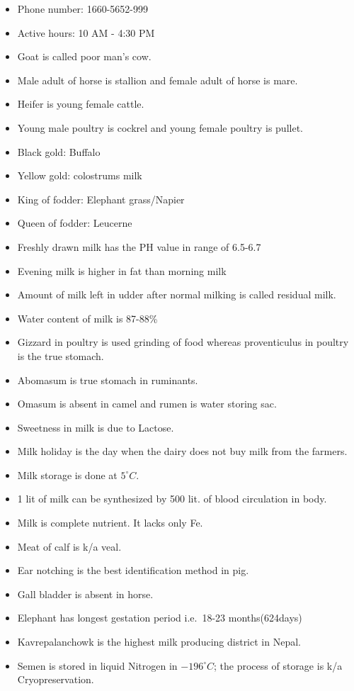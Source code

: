 \documentclass[
  openany]{book}
\begin{document}
\begin{itemize}
\item
  Phone number: 1660-5652-999
\item
  Active hours: 10 AM - 4:30 PM
\item
  Goat is called poor man's cow.
\item
  Male adult of horse is stallion and female adult of horse is mare.
\item
  Heifer is young female cattle.
\item
  Young male poultry is cockrel and young female poultry is pullet.
\item
  Black gold: Buffalo
\item
  Yellow gold: colostrums milk
\item
  King of fodder: Elephant grass/Napier
\item
  Queen of fodder: Leucerne
\item
  Freshly drawn milk has the PH value in range of 6.5-6.7
\item
  Evening milk is higher in fat than morning milk
\item
  Amount of milk left in udder after normal milking is called residual milk.
\item
  Water content of milk is 87-88\%
\item
  Gizzard in poultry is used grinding of food whereas proventiculus in poultry is the true stomach.
\item
  Abomasum is true stomach in ruminants.
\item
  Omasum is absent in camel and rumen is water storing sac.
\item
  Sweetness in milk is due to Lactose.
\item
  Milk holiday is the day when the dairy does not buy milk from the farmers.
\item
  Milk storage is done at \(5^\circ C\).
\item
  1 lit of milk can be synthesized by 500 lit. of blood circulation in body.
\item
  Milk is complete nutrient. It lacks only Fe.
\item
  Meat of calf is k/a veal.
\item
  Ear notching is the best identification method in pig.
\item
  Gall bladder is absent in horse.
\item
  Elephant has longest gestation period i.e.~18-23 months(624days)
\item
  Kavrepalanchowk is the highest milk producing district in Nepal.
\item
  Semen is stored in liquid Nitrogen in \(-196^\circ C\); the process of storage is k/a Cryopreservation.
\end{itemize}
\end{document}
